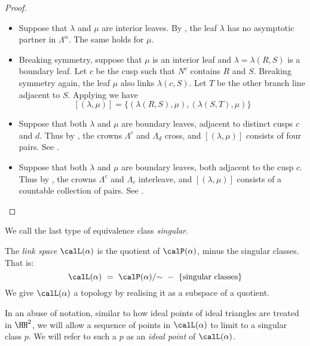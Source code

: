 \documentclass[12pt]{amsart}
\begin{document}
\begin{proof}
\mbox{}
\begin{itemize}
\item Suppose that $\lambda$ and $\mu$ are interior leaves. By , the leaf $\lambda$ has no asymptotic partner in $\Lambda^\alpha$. The same holds for $\mu$.

\item Breaking symmetry, suppose that $\mu$ is an interior leaf and $\lambda = \lambda(R,S)$ is a boundary leaf. Let $c$ be the cusp such that $N^c$ contains $R$ and $S$.  Breaking symmetry again, the leaf $\mu$ also links $\lambda(c, S)$. Let $T$ be the other branch line adjacent to $S$.  Applying  we have 
\[
[(\lambda, \mu)] = \{ (\lambda(R, S), \mu), (\lambda(S, T), \mu) \}
\] 

\item Suppose that both $\lambda$ and $\mu$ are boundary leaves, adjacent to distinct cusps $c$ and $d$.  Thus by , the crowns $\Lambda^c$ and $\Lambda_d$ cross, and $[(\lambda,\mu)]$ consists of four pairs.  See .

\item Suppose that both $\lambda$ and $\mu$ are boundary leaves, both adjacent to the cusp $c$. Thus by ,  the crowns $\Lambda^c$ and $\Lambda_c$ interleave, and $[(\lambda,\mu)]$ consists of a countable collection of pairs. See . \qedhere
\end{itemize}
\end{proof}

We call the last type of equivalence class \emph{singular}.  

\begin{definition}
\label{Def:LinkSpace}
The \emph{link space} $\calL(\alpha)$ is the quotient of $\calP(\alpha)$, minus the singular classes.  That is: 
\[
\calL(\alpha) \,\,=\,\, \calP(\alpha)/{\sim} \,\,-\,\, \{\mbox{singular classes}\}
\]
We give $\calL(\alpha)$ a topology by realising it as a subspace of a quotient.  
\end{definition}

In an abuse of notation, similar to how ideal points of ideal triangles are treated in $\HH^2$, we will allow a sequence of points in $\calL(\alpha)$ to limit to a singular class $p$.  We will refer to such a $p$ as an \emph{ideal point} of $\calL(\alpha)$. 
\end{document}
